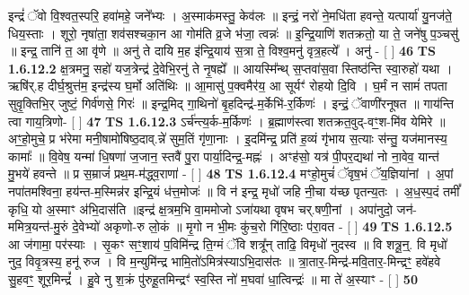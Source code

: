 \documentclass[17pt]{extarticle}
\begin{document}
                  इन्द्रं॑ ॅवो वि॒श्वत॒स्परि॒ हवा॑महे॒ जने᳚भ्यः । अ॒स्माक॑मस्तु॒ केव॑लः ॥ इन्द्रं॒ नरो॑ ने॒मधि॑ता हवन्ते॒ यत्पार्या॑ यु॒नज॑ते॒ धिय॒स्ताः । शूरो॒ नृषा॑ता॒ शव॑सश्चका॒न आ गोम॑ति व्र॒जे भ॑जा॒ त्वन्नः॑ ॥ इ॒न्द्रि॒याणि॑ शतक्रतो॒ या ते॒ जने॑षु प॒ञ्चसु॑ ॥ इन्द्र॒ तानि॑ त॒ आ वृ॑णे ॥ अनु॑ ते दायि म॒ह इ॑न्द्रि॒याय॑ स॒त्रा ते॒ विश्व॒मनु॑ वृत्र॒हत्ये᳚ । अनु॑ - [ ] \textbf{  46} \newline
                  \newline
                                \textbf{ TS 1.6.12.2} \newline
                  क्ष॒त्रमनु॒ सहो॑ यज॒त्रेन्द्र॑ दे॒वेभि॒रनु॑ ते नृ॒षह्ये᳚ ॥ आयस्मि᳚न्थ् स॒प्तवा॑स॒वा स्तिष्ठ॑न्ति स्वा॒रुहो॑ यथा । ऋषि॑र्.ह दीर्घ॒श्रुत्त॑म॒ इन्द्र॑स्य घ॒र्मो अति॑थिः ॥ आ॒मासु॑ प॒क्वमैर॑य॒ आ सूर्यꣳ॑ रोहयो दि॒वि । घ॒र्मं न सामं॑ तपता सुवृ॒क्तिभि॒र् जुष्टं॒ गिर्व॑णसे॒ गिरः॑ ॥ इन्द्र॒मिद् गा॒थिनो॑ बृ॒हदिन्द्र॑-म॒र्केभि॑-र॒र्किणः॑ । इन्द्रं॒ ॅवाणी॑रनूषत ॥ गाय॑न्ति त्वा गाय॒त्रिणो- [ ] \textbf{  47} \newline
                  \newline
                                \textbf{ TS 1.6.12.3} \newline
                  ऽर्च॑न्त्य॒र्क-म॒र्किणः॑ । ब्र॒ह्माण॑स्त्वा शतक्रत॒वुद्-वꣳ॒॒श-मि॑व येमिरे ॥ अꣳ॒॒हो॒मुचे॒ प्र भ॑रेमा मनी॒षामो॑षिष्ठ॒दाव्.न्ने॑ सुम॒तिं गृ॑णा॒नाः । इ॒दमि॑न्द्र॒ प्रति॑ ह॒व्यं गृ॑भाय स॒त्याः स॑न्तु॒ यज॑मानस्य॒ कामाः᳚ ॥ वि॒वेष॒ यन्मा॑ धि॒षणा॑ ज॒जान॒ स्तवै॑ पु॒रा पार्या॒दिन्द्र॒-मह्नः॑ । अꣳह॑सो॒ यत्र॑ पी॒पर॒द्यथा॑ नो ना॒वेव॒ यान्त॑ मु॒भये॑ हवन्ते ॥ प्र स॒म्राजं॑ प्रथ॒म-म॑द्ध्व॒राणा॑ - [ ] \textbf{  48} \newline
                  \newline
                                \textbf{ TS 1.6.12.4} \newline
                  मꣳहो॒मुचं॑ ॅवृष॒भं ॅय॒ज्ञिया॑नां । अ॒पां नपा॑तमश्विना॒ हय॑न्त-म॒स्मिन्न॑र इन्द्रि॒यं ध॑त्त॒मोजः॑ ॥ वि न॑ इन्द्र॒ मृधो॑ जहि नी॒चा य॑च्छ पृतन्य॒तः । अ॒ध॒स्प॒दं तमीं᳚ कृधि॒ यो अ॒स्माꣳ अ॑भि॒दास॑ति ॥इन्द्र॑ क्ष॒त्रम॒भि वा॒ममोजो ऽजा॑यथा वृषभ चर्.षणी॒नां । अपा॑नुदो॒ जन॑-ममित्र॒यन्त॑-मु॒रुं दे॒वेभ्यो॑ अकृणो-रु लो॒कं ॥ मृ॒गो न भी॒मः कु॑च॒रो गि॑रि॒ष्ठाः प॑रा॒वत - [ ] \textbf{  49} \newline
                  \newline
                                \textbf{ TS 1.6.12.5} \newline
                  आ ज॑गामा॒ पर॑स्याः । सृ॒कꣳ सꣳ॒॒शाय॑ प॒विमि॑न्द्र ति॒ग्मं ॅवि शत्रू᳚न् ताढि॒ विमृधो॑ नुदस्व ॥ वि शत्रू॒न्॒. वि मृधो॑ नुद॒ विवृ॒त्रस्य॒ हनू॑ रुज । वि म॒न्युमि॑न्द्र भामि॒तो॑ऽमित्र॑स्याऽभि॒दास॑तः ॥ त्रा॒तार॒-मिन्द्र॑-मवि॒तार॒-मिन्द्रꣳ॒॒ हवे॑हवे सु॒हवꣳ॒॒ शूर॒मिन्द्रं᳚ । हु॒वे नु श॒क्रं पु॑रुहू॒तमिन्द्रꣳ॑ स्व॒स्ति नो॑ म॒घवा॑ धा॒त्विन्द्रः॑ ॥ मा ते॑ अ॒स्याꣳ - [ ] \textbf{  50} \newline
\end{document}
